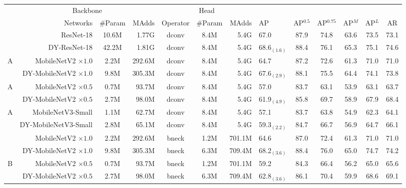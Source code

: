 \documentclass[10pt,twocolumn,letterpaper]{article}
\begin{document}
\begin{table}[t]
	\begin{center}
		\footnotesize
		\begin{tabular}{c|r c r| c c r|l c c c c c}
			\specialrule{.1em}{.05em}{.05em} 
			\multirow{2}{*}{Type} &\multicolumn{3}{c|}{Backbone}   &	\multicolumn{3}{c|}{Head} & &     &   &   & & \\
			                      & Networks&  \#Param & MAdds & Operator & \#Param & MAdds  & AP &	AP$^{0.5}$ & AP$^{0.75}$ & AP$^M$ & AP$^L$&	AR  \\
			\specialrule{.1em}{.05em}{.05em} 
			\multirow{2}{*}{A}&ResNet-18 & 10.6M & 1.77G & dconv & 8.4M & 5.4G     & 67.0 & 87.9 & 74.8 & 63.6 & 73.5 & 73.1 \\
			&DY-ResNet-18& 42.2M & 1.81G & dconv & 8.4M & 5.4G    & 68.6$_{(1.6)}$ &	88.4 & 76.1 & 65.3 & 75.1 & 74.6 \\
			\hline
			\multirow{2}{*}{A}&MobileNetV2 $\times1.0$  & 2.2M & 292.6M & dconv & 8.4M & 5.4G   &  64.7         & 87.2 & 72.6 & 61.3 & 71.0 & 71.0 \\
			&DY-MobileNetV2 $\times1.0$& 9.8M & 305.3M & dconv & 8.4M & 5.4G  &67.6$_{(2.9)}$ &	88.1 & 75.5 & 64.4 & 74.1 & 73.8 \\
			\hline
			\multirow{2}{*}{A}&MobileNetV2 $\times0.5$  & 0.7M & 93.7M & dconv & 8.4M & 5.4G   &{57.0}         & {83.7} & 	{63.1} &	{53.9}&		{63.1}&	{63.7}	 \\
			&DY-MobileNetV2 $\times0.5$& 2.7M & 98.0M & dconv & 8.4M & 5.4G  &61.9$_{(4.9)}$ & 	85.8 &	69.7&		58.9&	67.9&	68.4	 \\
			
			\hline
			\multirow{2}{*}{A}&MobileNetV3-Small        & 1.1M & 62.7M & dconv & 8.4M & 5.4G   &{57.1}& {83.7} & 	{63.8} &	{54.9}&		{62.3}&	{64.1}	 \\
			&DY-MobileNetV3-Small& 2.8M & 65.1M & dconv & 8.4M & 5.4G  &59.3$_{(2.2)}$ & 84.7	 &	66.7 &	56.9	&	64.7&	66.1	 \\
			\specialrule{.1em}{.05em}{.05em} 
			\multirow{2}{*}{B}&MobileNetV2 $\times1.0$  & 2.2M & 292.6M & bneck & 1.2M & 701.1M  &64.6           &87.0  & 72.4 & 61.3 & 71.0 & 71.0 \\
			&DY-MobileNetV2 $\times1.0$& 9.8M & 305.3M & bneck & 6.3M & 709.4M &68.2$_{(3.6)}$ &	88.4 & 76.0 & 65.0 & 74.7 & 74.2 \\
			\hline
			\multirow{2}{*}{B}&MobileNetV2 $\times0.5$  & 0.7M & 93.7M & bneck & 1.2M & 701.1M   &{59.2}         & {84.3} & 	{66.4} &	{56.2}&		{65.0}&	{65.6}	 \\
			&DY-MobileNetV2 $\times0.5$& 2.7M & 98.0M & bneck & 6.3M& 709.4M &62.8$_{(3.6)}$ & 	86.1 &	70.4&		59.9&	68.6&	69.1	 \\
			

\end{tabular}
\end{center}
\end{table}
\end{document}
